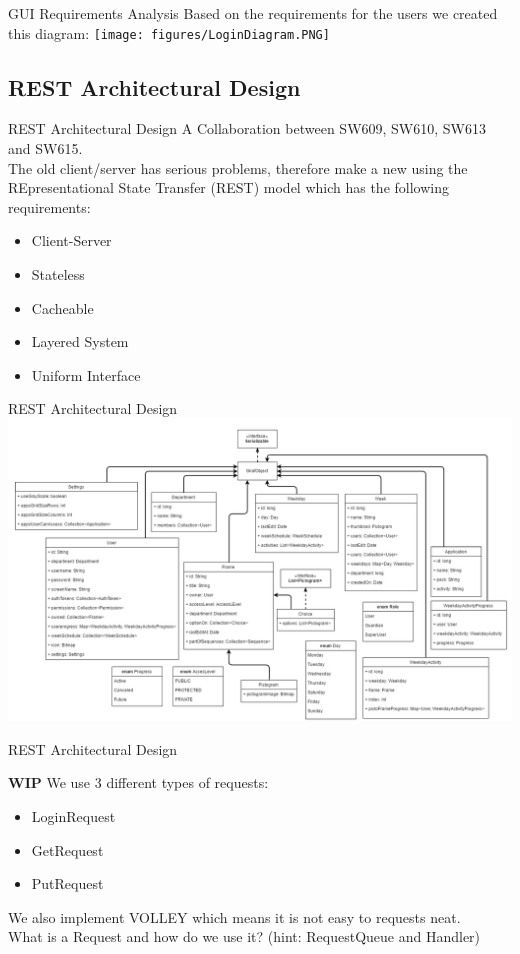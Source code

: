 \begin{frame}{GUI Requirements Analysis}
Based on the requirements for the users we created this diagram:
\texttt{[image: figures/LoginDiagram.PNG]}
\end{frame}

\subsection{REST Architectural Design}
\begin{frame}{REST Architectural Design}
A Collaboration between SW609, SW610, SW613 and SW615.\\

The old client/server has serious problems, therefore make a new using the REpresentational State Transfer (REST) model which has the following requirements:
\begin{itemize}
\item Client-Server
\item Stateless
\item Cacheable
\item Layered System
\item Uniform Interface
\end{itemize}
\end{frame}

\begin{frame}{REST Architectural Design}
\includegraphics[scale=0.3]{figures/Giraf_RestModelV3.PNG}
\end{frame}

\begin{frame}{REST Architectural Design}

\textbf{WIP}
We use 3 different types of requests:
\begin{itemize}
\item LoginRequest
\item GetRequest
\item PutRequest
\end{itemize}

We also implement VOLLEY which means it is not easy to requests neat.\\
What is a Request and how do we use it? (hint: RequestQueue and Handler)
\end{frame}

